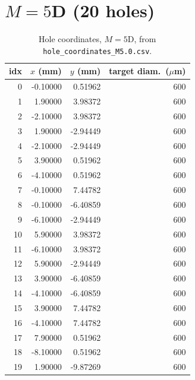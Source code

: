 \section{$M=5$D (20 holes)}
\begin{longtable}{rrrr}
\caption{Hole coordinates, $M=5$D, from \texttt{hole\_coordinates\_M5.0.csv}.}\\
\toprule
idx & $x$ (mm) & $y$ (mm) & target diam.\ ($\mu$m) \\
\midrule
\endhead
0 & -0.10000 & 0.51962 & 600 \\
1 & 1.90000 & 3.98372 & 600 \\
2 & -2.10000 & 3.98372 & 600 \\
3 & 1.90000 & -2.94449 & 600 \\
4 & -2.10000 & -2.94449 & 600 \\
5 & 3.90000 & 0.51962 & 600 \\
6 & -4.10000 & 0.51962 & 600 \\
7 & -0.10000 & 7.44782 & 600 \\
8 & -0.10000 & -6.40859 & 600 \\
9 & -6.10000 & -2.94449 & 600 \\
10 & 5.90000 & 3.98372 & 600 \\
11 & -6.10000 & 3.98372 & 600 \\
12 & 5.90000 & -2.94449 & 600 \\
13 & 3.90000 & -6.40859 & 600 \\
14 & -4.10000 & -6.40859 & 600 \\
15 & 3.90000 & 7.44782 & 600 \\
16 & -4.10000 & 7.44782 & 600 \\
17 & 7.90000 & 0.51962 & 600 \\
18 & -8.10000 & 0.51962 & 600 \\
19 & 1.90000 & -9.87269 & 600 \\
\bottomrule
\end{longtable}

